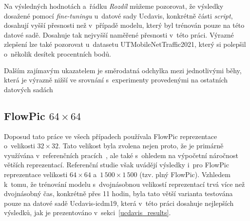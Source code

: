 \begin{table}[H]
    \centering
    \caption{Dosažené výsledky modelu CESNET a~dalších datový sad použitých pro \textit{fine-tuning} a~jejich porovnání.}
\end{table}

Na výsledných hodnotách a~řádku \textit{Rozdíl} můžeme pozorovat, že výsledky dosažené pomocí \textit{fine-tuningu} u~datové sady Ucdavis, konkrétně části \textit{script}, dosahují vyšší přesnosti než v~případě modelu, který byl trénován pouze na této datové sadě. Dosahuje tak nejvyšší naměřené přesnosti v~této práci. Výrazné zlepšení lze také pozorovat u~datasetu UTMobileNetTraffic2021, který si polepšil o~několik desítek procentních bodů.

Dalším zajímavým ukazatelem je směrodatná odchylka mezi jednotlivými běhy, která je výrazně nižší ve srovnání s~experimenty provedenými na ostatních datových sadách

\subsection{FlowPic $64\times64$}
Doposud tato práce ve všech případech používala FlowPic reprezentace o~velikosti $32\times32$. Tato velikost byla zvolena nejen proto, že je primárně využívána v~referenčních pracích~\cite{flowpic_augmentations,huawei_paper}, ale také s~ohledem na výpočetní náročnost větších reprezentací. Referenční studie však uvádějí výsledky i~pro FlowPic reprezentace velikosti $64\times64$ a~$1\,500\times1\,500$ (tzv. plný FlowPic). Vzhledem k~tomu, že trénování modelu s~dvojnásobnou velikostí reprezentací trvá více než dvojnásobný čas, konkrétně přes 11 hodin, byla tato větší varianta testována pouze na datové sadě Ucdavis-icdm19, která v~této práci dosahuje nejlepších výsledků, jak je prezentováno v~sekci~\ref{ucdavis_results}.

